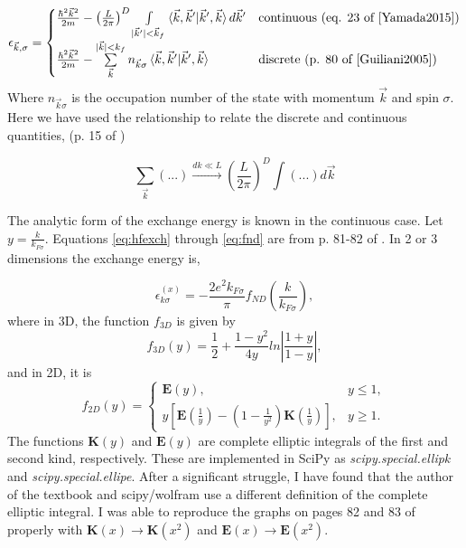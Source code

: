 \documentclass{revtex4}
\begin{document}
\begin{equation}
\epsilon_{\vec{k},\sigma}=
\begin{cases}
	\frac{\hbar^2\vec{k}^2}{2m}-\left(\frac{L}{2\pi}\right)^D\int\limits_{|\vec{k}'|<\vec{k}_f}^{}\braket{\vec{k}, \vec{k}' |\vec{k}', \vec{k}}d\vec{k}'
	&\text{continuous (eq. 23 of \cite{Yamada2015})} \\
	\frac{\hbar^2\vec{k}^2}{2m} - \sum\limits_{\vec{k}}^{|\vec{k}|< k_f}n_{\vec{k}\sigma}\braket{\vec{k}, \vec{k}' |\vec{k}', \vec{k}}
	&\text{discrete (p. 80 of \cite{Guiliani2005})}
\end{cases}
\end{equation}
Where $n_{\vec{k}\sigma}$ is the occupation number of the state with momentum $\vec{k}$ and spin $\sigma$. Here we have used the relationship to relate the discrete and continuous quantities, (p. 15 of \cite{Guiliani2005})

\begin{equation}
	\sum\limits_{\vec{k}}^{}{(...)}\xrightarrow{\text{$dk \ll L$}}\left(\frac{L}{2\pi}\right)^D\int (...)d\vec{k}
\end{equation}

The analytic form of the exchange energy is known in the continuous case. Let $y = \frac{k}{k_{F\sigma}}$. Equations \ref{eq:hfexch} through \ref{eq:fnd} are from p. 81-82 of \cite{Guiliani2005}. In 2 or 3 dimensions the exchange energy is, 

\begin{equation}\label{eq:hfexch}
\epsilon_{k\sigma}^{(x)} = -\frac{2e^2k_{F\sigma}}{\pi}f_{ND}\left(\frac{k}{k_{F\sigma}}\right),
\end{equation}
where in 3D, the function $f_{3D}$ is given by
\begin{equation}
f_{3D}\left(y\right) = \frac{1}{2} + \frac{1-y^2}{4y} ln \left|\frac{1+y}{1-y} \right|,
\end{equation}
and in 2D, it is
\begin{equation}\label{eq:fnd}
f_{2D}\left(y\right) = 
\begin{cases} 
    \mathbf{E}\left(y\right), &  y \leq 1, \\
    y 
    \left[ 
        \mathbf{E} 
        \left(
            \frac{1}{y} 
        \right)
        -
        \left(
            1 - \frac{1}{y^2}
        \right)
        \mathbf{K}
        \left(
            \frac{1}{y}
        \right)
       \right]  ,& y \geq 1. 
\end{cases}
\end{equation}
The functions $\mathbf{K}(y)$ and $ \mathbf{E}(y) $ are complete elliptic integrals of the first and second kind, respectively. These are implemented in SciPy as \emph{scipy.special.ellipk} and \emph{scipy.special.ellipe}. After a significant struggle, I have found that the author of the textbook\cite{Guiliani2005} and scipy/wolfram use a different definition of the complete elliptic integral. I was able to reproduce the graphs on pages 82 and 83 of \cite{Guiliani2005} properly with $\mathbf{K}(x) \rightarrow \mathbf{K}(x^2)$ and $\mathbf{E}(x) \rightarrow \mathbf{E}(x^2)$.
\end{document}
